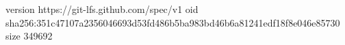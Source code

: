 version https://git-lfs.github.com/spec/v1
oid sha256:351c47107a2356046693d53fd486b5ba983bd46b6a81241edf18f8e046e85730
size 349692
